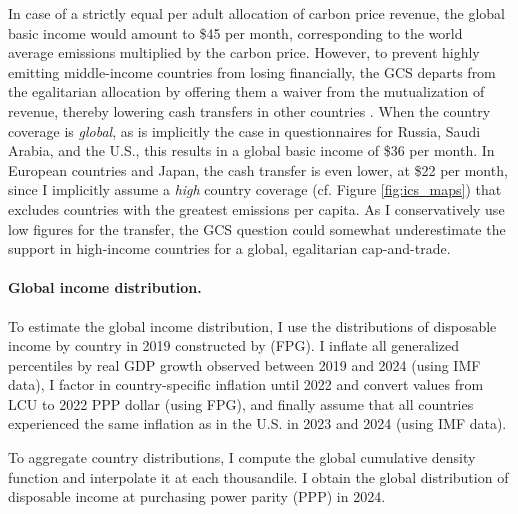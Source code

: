 In case of a strictly equal per adult allocation of carbon price revenue, the global basic income would amount to \$45 per month, corresponding to the world average emissions multiplied by the carbon price. However, to prevent highly emitting middle-income countries from losing financially, the GCS departs from the egalitarian allocation by offering them a waiver from the mutualization of revenue, thereby lowering cash transfers in other countries \citep{fabre_plan_2024}. 
When the country coverage is \textit{global}, as is implicitly the case in questionnaires for Russia, Saudi Arabia, and the U.S., this results in a global basic income of \$36 per month. 
In European countries and Japan, the cash transfer is even lower, at \$22 per month, since I implicitly assume a \textit{high} country coverage (cf. Figure \ref{fig:ics_maps}) that excludes countries with the greatest emissions per capita. 
As I conservatively use low figures for the transfer, the GCS question could somewhat underestimate the support in high-income countries for a global, egalitarian cap-and-trade. 


\paragraph{Global income distribution.}

To estimate the global income distribution, I use the distributions of disposable income by country in 2019 constructed by \cite{fisher-post_government_2023} (FPG). I inflate all generalized percentiles by real GDP growth observed between 2019 and 2024 (using IMF data), I factor in country-specific inflation until 2022 and convert values from LCU to 2022 PPP dollar (using FPG), and finally assume that all countries experienced the same inflation as in the U.S. in 2023 and 2024 (using IMF data). 

To aggregate country distributions, I compute the global cumulative density function and interpolate it at each thousandile. I obtain the global distribution of disposable income at purchasing power parity (PPP) in 2024. 

